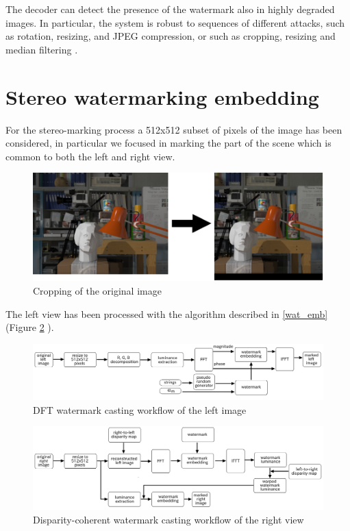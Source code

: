 The decoder can detect the presence of the watermark also in highly degraded images. In particular, the system is robust to sequences of different attacks, such as rotation, resizing, and JPEG compression, or such as cropping, resizing and median filtering \cite{PIVA}.

\section{Stereo watermarking embedding}

For the stereo-marking process a 512x512 subset of pixels of the image has been considered, in particular we focused in marking the part of the scene which is common to both the left and right view.

\begin{figure}[h!]
\centering
\includegraphics[width=1\textwidth]{./img/cropping.png}
\caption{\small{Cropping of the original image}}
\label{fig:cropped}
\end{figure}

The left view has been processed with the algorithm described in \ref{wat_emb} (Figure \ref{fig:left_wat} ).\newline 


\begin{figure}[h!]
\centering
\includegraphics[width=1\textwidth]{./img/left_wat.png}
\caption{\small{DFT watermark casting workflow of the left image}\label{fig:left_wat}}

\end{figure}


\begin{figure}[h!]
\centering
\includegraphics[width=1\textwidth]{./img/pros.png}
\caption{\small{Disparity-coherent watermark casting workflow of the right view}}
\label{fig:right_wat}
\end{figure}


